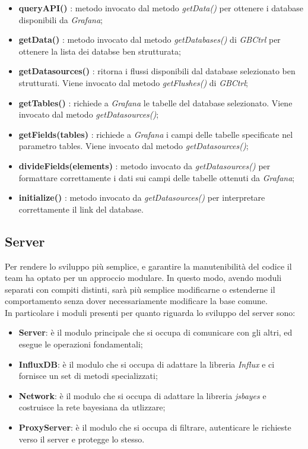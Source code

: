 \begin{itemize}
\begin{itemize}
				\item \textbf{queryAPI()} : metodo invocato dal metodo \textit{getData()} per ottenere i database disponibili da \textit{Grafana};
				\item \textbf{getData()} : metodo invocato dal metodo \textit{getDatabases()} di \textit{GBCtrl} per ottenere la lista dei databse ben strutturata;
				\item \textbf{getDatasources()} : ritorna i flussi disponibili dal database selezionato ben strutturati. Viene invocato dal metodo \textit{getFlushes()} di \textit{GBCtrl};
				\item \textbf{getTables()} : richiede a \textit{Grafana} le tabelle del database selezionato. Viene invocato dal metodo \textit{getDatasources()};
				\item \textbf{getFields(tables)} : richiede a \textit{Grafana} i campi delle tabelle specificate nel parametro tables. Viene invocato dal metodo \textit{getDatasources()};
				\item \textbf{divideFields(elements)} : metodo invocato da \textit{getDatasources()} per formattare correttamente i dati sui campi delle tabelle ottenuti da \textit{Grafana};
				\item \textbf{initialize()} : metodo invocato da \textit{getDatasources()} per interpretare correttamente il link del database.
			\end{itemize}
\end{itemize}



\subsection{Server}\label{archServer}
Per rendere lo sviluppo più semplice, e garantire la manutenibilità del codice il team ha optato per un approccio modulare. In questo modo, avendo moduli separati con compiti distinti, sarà più semplice modificarne o estenderne il comportamento senza dover necessariamente modificare la base comune.\\
In particolare i moduli presenti per quanto riguarda lo sviluppo del server sono:
\begin{itemize}
	\item \textbf{Server}: è il modulo principale che si occupa di comunicare con gli altri, ed esegue le operazioni fondamentali;
	\item \textbf{InfluxDB}: è il modulo che si occupa di adattare la libreria \textit{Influx} e ci fornisce un set di metodi specializzati;
	\item \textbf{Network}: è il modulo che si occupa di adattare la libreria \textit{jsbayes} e costruisce la rete bayesiana da utlizzare;
	\item \textbf{ProxyServer}: è il modulo che si occupa di filtrare, autenticare le richieste verso il server e  protegge lo stesso.
\end{itemize}

